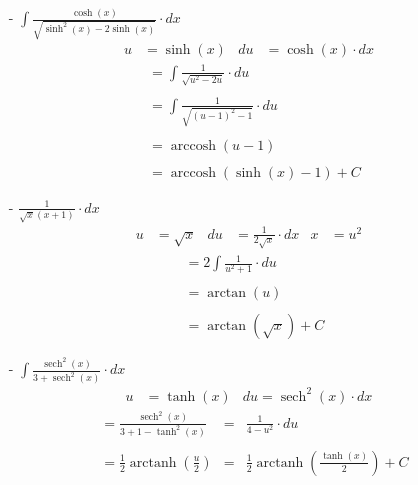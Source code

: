\documentclass{report}
\DeclareMathOperator{\sech}{sech}
\DeclareMathOperator{\arccosh}{arccosh}
\DeclareMathOperator{\arctanh}{arctanh}
\begin{document}
  \newpage

  \begin{itemize}
    \item[-] $\displaystyle{\int \frac{\cosh(x)}{{\sqrt{\sinh^2(x) - 2\sinh(x)}}} \cdot dx}$
      \begin{align*}
        u & = \sinh(x) & du & = \cosh(x) \cdot dx
      \end{align*}
      \begin{align*}
        & = \int \frac{1}{\sqrt{u^2 - 2u}} \cdot du \\\\
        & = \int \frac{1}{\sqrt{(u - 1)^2 - 1}} \cdot du \\\\
        & = \arccosh(u-1) \\\\
        & = \arccosh(\sinh(x) - 1) + C
      \end{align*}
  \end{itemize}

  \newpage

  \begin{itemize}
    \item[-] $\displaystyle{\frac{1}{\sqrt{x}(x + 1)} \cdot dx}$
      \begin{align*}
        u & = \sqrt{x} & du & = \frac{1}{2\sqrt{x}} \cdot dx & x & = u^2
      \end{align*}
      \begin{align*}
        & = 2 \int \frac{1}{u^2 + 1} \cdot du \\\\
        & = \arctan(u) \\\\
        & = \arctan(\sqrt{x}) + C
      \end{align*}
  \end{itemize}

  \newpage

  \begin{itemize}
    \item[-] $\displaystyle{\int \frac{\sech^2(x)}{3 + \sech^2(x)} \cdot dx}$
      \begin{align*}
        u & = \tanh(x) & du = \sech^2(x) \cdot dx
      \end{align*}
      \begin{align*}
        & = \frac{\sech^2(x)}{3 + 1 - \tanh^2(x)} & = & \frac{1}{4 - u^2} \cdot du \\\\
        & = \frac{1}{2} \arctanh(\frac{u}{2}) & = & \frac{1}{2} \arctanh(\frac{\tanh(x)}{2}) + C
      \end{align*}
  \end{itemize}
\end{document}

